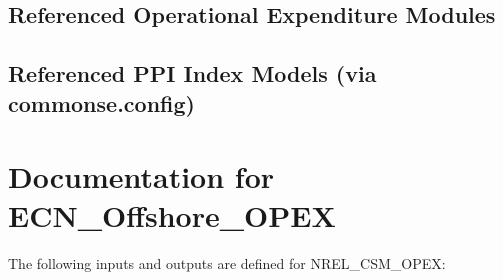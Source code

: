 \documentclass[letterpaper,10pt,openany,oneside]{sphinxmanual}
\begin{document}
\subsection{Referenced Operational Expenditure Modules}
\label{documentation:referenced-operational-expenditure-modules}\label{documentation:module-plant_costsse.nrel_csm_opex.nrel_csm_opex}

\begin{fulllineitems}
\label{documentation:plant_costsse.nrel_csm_opex.nrel_csm_opex.opex_csm_component}
\end{fulllineitems}


\begin{fulllineitems}
\label{documentation:plant_costsse.nrel_csm_opex.nrel_csm_opex.opex_csm_assembly}
\end{fulllineitems}



\subsection{Referenced PPI Index Models (via commonse.config)}
\label{documentation:id1}\label{documentation:module-commonse.csmPPI}

\begin{fulllineitems}
\end{fulllineitems}



\section{Documentation for ECN\_Offshore\_OPEX}
\label{documentation:documentation-for-ecn-offshore-opex}
The following inputs and outputs are defined for NREL\_CSM\_OPEX:
\end{document}
